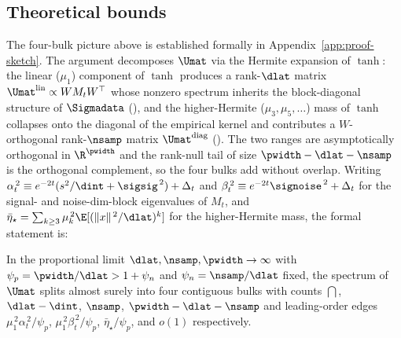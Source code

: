
\subsection{Theoretical bounds}
\label{sec:rfnn-bounds}

The four-bulk picture above is established formally in
Appendix~\ref{app:proof-sketch}. The argument decomposes $\Umat$ via
the Hermite expansion of $\tanh$: the linear ($\mu_1$) component of
$\tanh$ produces a rank-$\dlat$ matrix
$\Umat^{\mathrm{lin}} \propto W M_t W^{\top}$ whose nonzero spectrum
inherits the block-diagonal structure of $\Sigmadata$
(), and the higher-Hermite ($\mu_3, \mu_5, \ldots$)
mass of $\tanh$ collapses onto the diagonal of the empirical kernel
and contributes a $W$-orthogonal rank-$\nsamp$ matrix
$\Umat^{\mathrm{diag}}$ (). The two ranges are
asymptotically orthogonal in $\R^{\pwidth}$ and the rank-null tail
of size $\pwidth - \dlat - \nsamp$ is the orthogonal complement,
so the four bulks add without overlap. Writing
$\alpha_t^{\,2} \equiv e^{-2t}(s^2/\dint + \sigsig^{\,2}) + \Delta_t$
and $\beta_t^{\,2} \equiv e^{-2t}\signoise^{\,2} + \Delta_t$ for the
signal- and noise-dim-block eigenvalues of $M_t$, and
$\bar\eta_\star = \sum_{k\ge 3}\mu_k^{\,2}\E[(\|x\|^{\,2}/\dlat)^k]$
for the higher-Hermite mass, the formal statement is:

\begin{theorem}
\label{thm:fourbulk-body}
In the proportional limit
$\dlat,\nsamp,\pwidth\to\infty$ with $\psi_p = \pwidth/\dlat > 1+\psi_n$
and $\psi_n = \nsamp/\dlat$ fixed, the spectrum of $\Umat$ splits
almost surely into four contiguous bulks with counts $\dint$,
$\dlat - \dint$, $\nsamp$, $\pwidth - \dlat - \nsamp$ and
leading-order edges $\mu_1^{\,2}\alpha_t^{\,2}/\psi_p$,
$\mu_1^{\,2}\beta_t^{\,2}/\psi_p$, $\bar\eta_\star/\psi_p$, and
$o(1)$ respectively.
\end{theorem}

